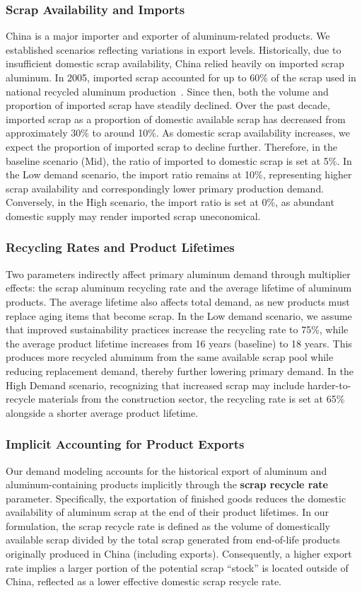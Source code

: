 \documentclass[preprint,12pt]{elsarticle}
\begin{document}
\subsubsection{Scrap Availability and Imports}
China is a major importer and exporter of aluminum-related products. We established scenarios reflecting variations in export levels. Historically, due to insufficient domestic scrap availability, China relied heavily on imported scrap aluminum. In 2005, imported scrap accounted for up to 60\% of the scrap used in national recycled aluminum production~\citep{li_when_2020}. Since then, both the volume and proportion of imported scrap have steadily declined. Over the past decade, imported scrap as a proportion of domestic available scrap has decreased from approximately 30\% to around 10\%. As domestic scrap availability increases, we expect the proportion of imported scrap to decline further. Therefore, in the baseline scenario (Mid), the ratio of imported to domestic scrap is set at 5\%. In the Low demand scenario, the import ratio remains at 10\%, representing higher scrap availability and correspondingly lower primary production demand. Conversely, in the High scenario, the import ratio is set at 0\%, as abundant domestic supply may render imported scrap uneconomical.

\subsubsection{Recycling Rates and Product Lifetimes}
Two parameters indirectly affect primary aluminum demand through multiplier effects: the scrap aluminum recycling rate and the average lifetime of aluminum products. The average lifetime also affects total demand, as new products must replace aging items that become scrap. In the Low demand scenario, we assume that improved sustainability practices increase the recycling rate to 75\%, while the average product lifetime increases from 16 years (baseline) to 18 years. This produces more recycled aluminum from the same available scrap pool while reducing replacement demand, thereby further lowering primary demand. In the High Demand scenario, recognizing that increased scrap may include harder-to-recycle materials from the construction sector, the recycling rate is set at 65\% alongside a shorter average product lifetime.


\subsubsection{Implicit Accounting for Product Exports}\label{product_exports}
Our demand modeling accounts for the historical export of aluminum and aluminum-containing products implicitly through the \textbf{scrap recycle rate} parameter. Specifically, the exportation of finished goods reduces the domestic availability of aluminum scrap at the end of their product lifetimes. In our formulation, the scrap recycle rate is defined as the volume of domestically available scrap divided by the total scrap generated from end-of-life products originally produced in China (including exports). Consequently, a higher export rate implies a larger portion of the potential scrap ``stock'' is located outside of China, reflected as a lower effective domestic scrap recycle rate. 
\end{document}
